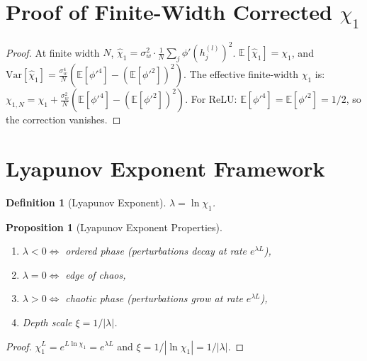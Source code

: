 \documentclass[10pt]{article}
\newcommand{\EE}{\mathbb{E}}
\newcommand{\Var}{\mathrm{Var}}
\newtheorem{proposition}[theorem]{Proposition}
\newtheorem{definition}[theorem]{Definition}
\begin{document}
\section{Proof of Finite-Width Corrected $\chi_1$}
\label{app:corrected-chi1-proof}

\begin{proof}
At finite width $N$, $\hat{\chi}_1 = \sigma_w^2 \cdot \frac{1}{N}\sum_j \phi'(h_j^{(l)})^2$.
$\EE[\hat{\chi}_1] = \chi_1$, and $\Var[\hat{\chi}_1] = \frac{\sigma_w^4}{N}(\EE[\phi'^4] - (\EE[\phi'^2])^2)$.
The effective finite-width $\chi_1$ is:
$\chi_{1,N} = \chi_1 + \frac{\sigma_w^2}{N}(\EE[\phi'^4] - (\EE[\phi'^2])^2)$.
For ReLU: $\EE[\phi'^4] = \EE[\phi'^2] = 1/2$, so the correction vanishes.
\end{proof}

\section{Lyapunov Exponent Framework}
\label{app:lyapunov}

\begin{definition}[Lyapunov Exponent]
$\lambda = \ln \chi_1$.
\end{definition}

\begin{proposition}[Lyapunov Exponent Properties]
\label{prop:lyapunov}
\begin{enumerate}[nosep]
    \item $\lambda < 0 \Leftrightarrow$ ordered phase (perturbations decay at rate $e^{\lambda L}$),
    \item $\lambda = 0 \Leftrightarrow$ edge of chaos,
    \item $\lambda > 0 \Leftrightarrow$ chaotic phase (perturbations grow at rate $e^{\lambda L}$),
    \item Depth scale $\xi = 1/|\lambda|$.
\end{enumerate}
\end{proposition}

\begin{proof}
$\chi_1^L = e^{L \ln \chi_1} = e^{\lambda L}$ and $\xi = 1/|\ln \chi_1| = 1/|\lambda|$.
\end{proof}

\end{document}
